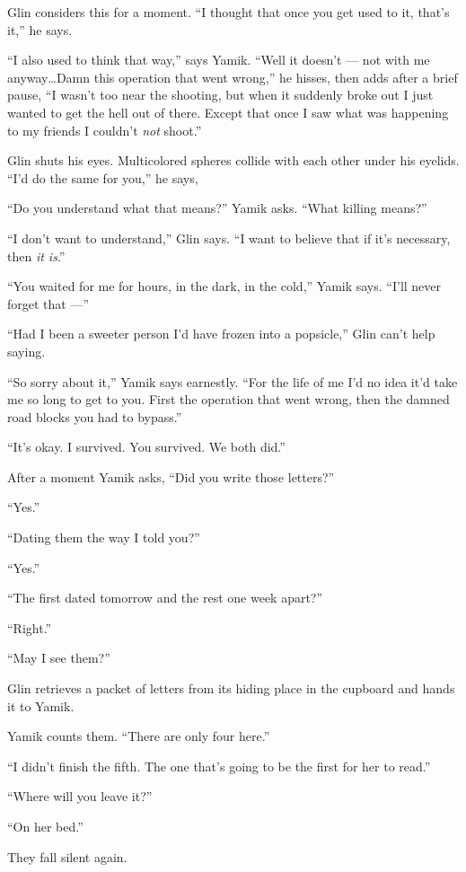 \documentclass[twoside,11pt,openany]{book}
\begin{document}
Glin considers this for a moment. ``I thought that once you get used to it, that's it,'' he
says.

``I also used to think that way,'' says Yamik. ``Well it doesn't --- not with me anyway{\ldots}Damn this
operation that went wrong,'' he hisses, then adds after a brief pause, ``I wasn't too near
the shooting, but when it suddenly{ }broke out I
just{ }wanted to get the hell out of there. Except that once I saw what was
happening to my friends I couldn't \textit{not} shoot.''

Glin shuts his eyes. Multicolored spheres collide with each other under his eyelids. ``I'd do the same for
you,'' he says,

``Do you understand what that means?'' Yamik asks. ``What killing
means?''

``I don't want to understand,'' Glin says. ``I want to believe that if it's
necessary, then \textit{it is}.''

``You waited for me for hours, in the dark, in the cold,'' Yamik says. ``I'll
never forget that ---''

``Had I been a sweeter person I'd have frozen into a popsicle,'' Glin can't help saying.

``So sorry about it,'' Yamik says earnestly. ``For the life of me I'd no idea
it'd take me so long to get to you. First the operation that went wrong, then the damned road blocks you had to
bypass.''

``It's okay. I survived. You survived. We both did.''

After a moment Yamik asks, ``Did you write those letters?''

``Yes.''

``Dating them the way I told you?''

``Yes.''

``The first dated tomorrow and the rest one week apart?''

``Right.''

``May I see them?''

Glin retrieves a packet of letters from its hiding place in the cupboard and hands it to Yamik.

Yamik counts them. ``There are only four here.''

``I didn't finish the fifth. The one that's going to be the first for her to read.''

``Where will you leave it?''

``On her bed.''

They fall silent again.
\end{document}
